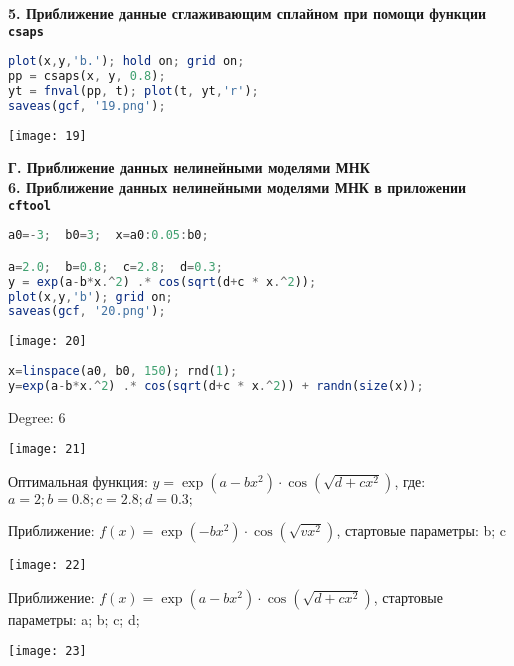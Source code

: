\documentclass[a4paper]{article}
\begin{document}
\newpage
{\textbf{5. Приближение данные сглаживающим сплайном при помощи функции \texttt{csaps}}}
\begin{lstlisting}[language=Octave, firstnumber=67]
plot(x,y,'b.'); hold on; grid on;
pp = csaps(x, y, 0.8);
yt = fnval(pp, t); plot(t, yt,'r');
saveas(gcf, '19.png');
\end{lstlisting}
\begin{center}
    \texttt{[image: 19]}
\end{center}

\newpage
{\Large{\textbf{Г. Приближение данных нелинейными моделями МНК}}}\\
{\textbf{6. Приближение данных нелинейными моделями МНК в приложении \texttt{cftool}}}
\begin{lstlisting}[language=Octave, firstnumber=72]
a0=-3;  b0=3;  x=a0:0.05:b0;

a=2.0;  b=0.8;  c=2.8;  d=0.3;
y = exp(a-b*x.^2) .* cos(sqrt(d+c * x.^2));
plot(x,y,'b'); grid on;
saveas(gcf, '20.png');
\end{lstlisting}
\begin{center}
    \texttt{[image: 20]}
\end{center}
\begin{lstlisting}[language=Octave, firstnumber=78]
x=linspace(a0, b0, 150); rnd(1);
y=exp(a-b*x.^2) .* cos(sqrt(d+c * x.^2)) + randn(size(x));
\end{lstlisting}
Degree: 6
\begin{center}
    \texttt{[image: 21]}
\end{center}

\newpage
Оптимальная функция: $y=\exp(a-bx^2) \cdot \cos(\sqrt{d+c x^2})$, где: $a=2;b=0.8;c=2.8;d=0.3;$

Приближение: $f(x) = \exp(-bx^2) \cdot \cos(\sqrt{vx^2})$, стартовые параметры: b; c
\begin{center}
    \texttt{[image: 22]}
\end{center}
Приближение: $f(x) =\exp(a-bx^2) \cdot \cos(\sqrt{d+c x^2})$, стартовые параметры: a; b; c; d;
\begin{center}
    \texttt{[image: 23]}
\end{center}
\end{document}
